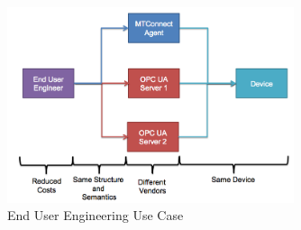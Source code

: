 \begin{figure}[h]
  \centering
  \includegraphics[width=0.75\textwidth]{diagrams/EndUserUseCase.png}
  \caption{End User Engineering Use Case}
  \label{fig:end_user_use_case}
\end{figure}
